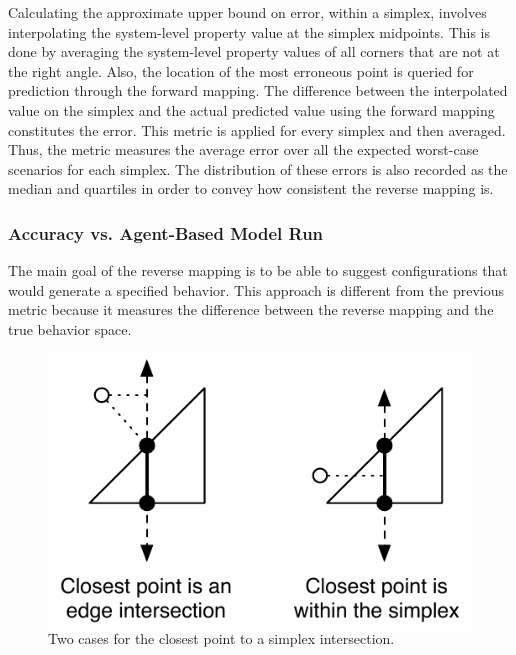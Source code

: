 Calculating the approximate upper bound on error, within a simplex, involves interpolating the system-level property value at the simplex midpoints.
This is done by averaging the system-level property values of all corners that are not at the right angle.
Also, the location of the most erroneous point is queried for prediction through the forward mapping.
The difference between the interpolated value on the simplex and the actual predicted value using the forward mapping constitutes the error.
This metric is applied for every simplex and then averaged.
Thus, the metric measures the average error over all the expected worst-case scenarios for each simplex.
The distribution of these errors is also recorded as the median and quartiles in order to convey how consistent the reverse mapping is.


  \subsubsection{Accuracy vs. Agent-Based Model Run}

The main goal of the reverse mapping is to be able to suggest configurations that would generate a specified behavior.
This approach is different from the previous metric because it measures the difference between the reverse mapping and the true behavior space.

\begin{figure}[ht]
\centering
\includegraphics[scale=1]{images/closest.pdf}
\caption{Two cases for the closest point to a simplex intersection.}
\label{fig:closest}
\end{figure}

